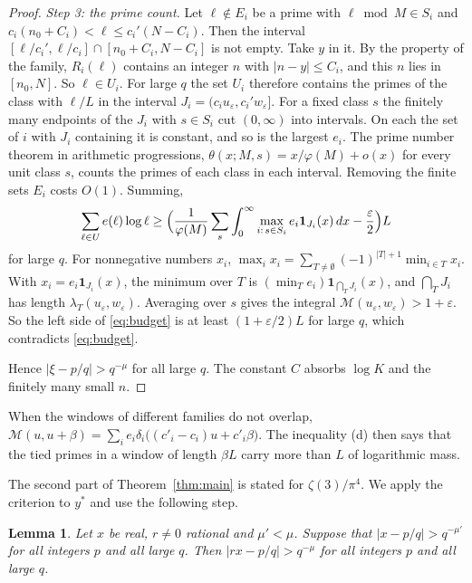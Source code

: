 \documentclass[11pt]{amsart}
\newtheorem{lemma}[theorem]{Lemma}
\theoremstyle{definition}
\theoremstyle{remark}
\numberwithin{equation}{section}
\newcommand{\cM}{\mathcal M}
\begin{document}
\begin{proof}
\emph{Step 3: the prime count.} Let $\ell\notin E_i$ be a prime with $\ell\bmod M\in S_i$ and
$c_i(n_0+C_i)<\ell\le c_i'(N-C_i)$. Then the interval $[\ell/c_i',\ell/c_i]\cap[n_0+C_i,N-C_i]$ is not empty. Take
$y$ in it. By the property of the family, $R_i(\ell)$ contains an integer $n$ with $|n-y|\le C_i$, and this $n$ lies in
$[n_0,N]$. So $\ell\in U_i$. For large $q$ the set $U_i$ therefore contains the primes of the class with $\ell/L$ in the interval
$J_i=(c_iu_\varepsilon,c_i'w_\varepsilon]$. For a fixed class $s$ the finitely many endpoints of the $J_i$ with
$s\in S_i$ cut $(0,\infty)$ into intervals. On each the set of $i$ with $J_i$ containing it is constant, and so is the
largest $e_i$. The prime number theorem in arithmetic progressions,
$\theta(x;M,s)=x/\varphi(M)+o(x)$ for every unit class $s$, counts the primes of each class in each interval. Removing
the finite sets $E_i$ costs $O(1)$. Summing,
\[
 \sum_{\ell\in U}e(\ell)\log\ell\ge\Bigl(\frac1{\varphi(M)}\sum_s\int_0^\infty\max_{i:\,s\in S_i}e_i\mathbf 1_{J_i}(x)\,dx
 -\frac\varepsilon2\Bigr)L
\]
for large $q$. For nonnegative numbers $x_i$, $\max_ix_i=\sum_{T\ne\emptyset}(-1)^{|T|+1}\min_{i\in T}x_i$. With
$x_i=e_i\mathbf 1_{J_i}(x)$, the minimum over $T$ is $(\min_Te_i)\mathbf 1_{\bigcap_TJ_i}(x)$, and
$\bigcap_TJ_i$ has length $\lambda_T(u_\varepsilon,w_\varepsilon)$. Averaging over $s$ gives the integral
$\cM(u_\varepsilon,w_\varepsilon)>1+\varepsilon$. So the left side of \eqref{eq:budget} is at least
$(1+\varepsilon/2)L$ for large $q$, which contradicts \eqref{eq:budget}.

Hence $|\xi-p/q|>q^{-\mu}$ for all large $q$. The constant $C$ absorbs $\log K$ and the finitely many small $n$.
\end{proof}

When the windows of different families do not overlap, $\cM(u,u+\beta)=\sum_ie_i\delta_i\bigl((c'_i-c_i)u+c'_i\beta\bigr)$. The inequality
(d) then says that the tied primes in a window of length $\beta L$ carry more than $L$ of logarithmic mass.

The second part of Theorem~\ref{thm:main} is stated for $\zeta(3)/\pi^4$. We apply the criterion to $y^*$ and use the
following step.

\begin{lemma}\label{lem:scale}
Let $x$ be real, $r\ne0$ rational and $\mu'<\mu$. Suppose that $|x-p/q|>q^{-\mu'}$ for all integers $p$ and all large
$q$. Then $|rx-p/q|>q^{-\mu}$ for all integers $p$ and all large $q$.
\end{lemma}
\end{document}
